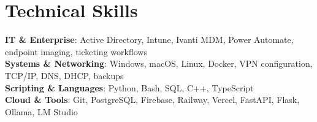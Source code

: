 \documentclass[letterpaper,11pt]{article}
\begin{document}
\section{Technical Skills}
 \begin{itemize}[leftmargin=0.15in, label={}]
    \small{\item{
     \textbf{IT \& Enterprise}{: Active Directory, Intune, Ivanti MDM, Power Automate, endpoint imaging, ticketing workflows} \\
     \textbf{Systems \& Networking}{: Windows, macOS, Linux, Docker, VPN configuration, TCP/IP, DNS, DHCP, backups} \\
     \textbf{Scripting \& Languages}{: Python, Bash, SQL, C++, TypeScript} \\
     \textbf{Cloud \& Tools}{: Git, PostgreSQL, Firebase, Railway, Vercel, FastAPI, Flask, Ollama, LM Studio}
    }}
 \end{itemize}
\end{document}
